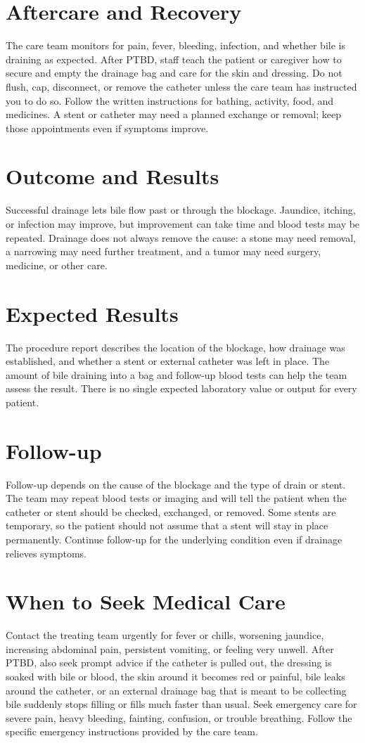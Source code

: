 \section*{Aftercare and Recovery}
The care team monitors for pain, fever, bleeding, infection, and whether bile is draining as expected. After PTBD, staff teach the patient or caregiver how to secure and empty the drainage bag and care for the skin and dressing. Do not flush, cap, disconnect, or remove the catheter unless the care team has instructed you to do so. Follow the written instructions for bathing, activity, food, and medicines. A stent or catheter may need a planned exchange or removal; keep those appointments even if symptoms improve.

\section*{Outcome and Results}
Successful drainage lets bile flow past or through the blockage. Jaundice, itching, or infection may improve, but improvement can take time and blood tests may be repeated. Drainage does not always remove the cause: a stone may need removal, a narrowing may need further treatment, and a tumor may need surgery, medicine, or other care.

\section*{Expected Results}
The procedure report describes the location of the blockage, how drainage was established, and whether a stent or external catheter was left in place. The amount of bile draining into a bag and follow-up blood tests can help the team assess the result. There is no single expected laboratory value or output for every patient.

\section*{Follow-up}
Follow-up depends on the cause of the blockage and the type of drain or stent. The team may repeat blood tests or imaging and will tell the patient when the catheter or stent should be checked, exchanged, or removed. Some stents are temporary, so the patient should not assume that a stent will stay in place permanently. Continue follow-up for the underlying condition even if drainage relieves symptoms.

\section*{When to Seek Medical Care}
Contact the treating team urgently for fever or chills, worsening jaundice, increasing abdominal pain, persistent vomiting, or feeling very unwell. After PTBD, also seek prompt advice if the catheter is pulled out, the dressing is soaked with bile or blood, the skin around it becomes red or painful, bile leaks around the catheter, or an external drainage bag that is meant to be collecting bile suddenly stops filling or fills much faster than usual. Seek emergency care for severe pain, heavy bleeding, fainting, confusion, or trouble breathing. Follow the specific emergency instructions provided by the care team.

